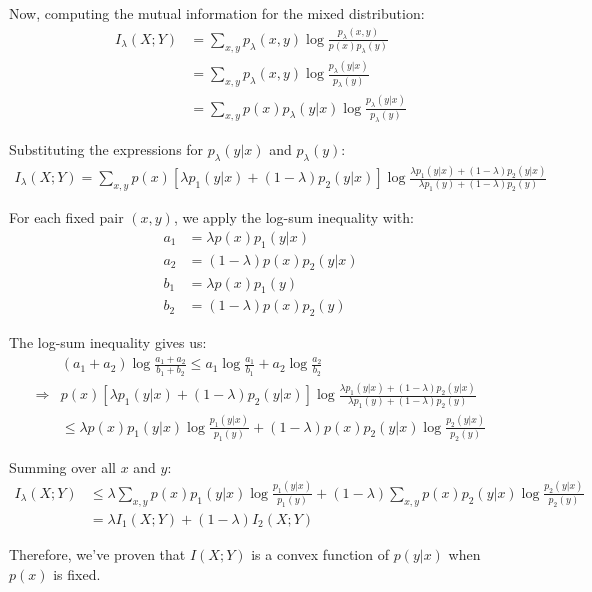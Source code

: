 Now, computing the mutual information for the mixed distribution:
\begin{align*}
I_{\lambda}(X;Y) &= \sum_{x,y} p_{\lambda}(x,y) \log \frac{p_{\lambda}(x,y)}{p(x)p_{\lambda}(y)} \\
&= \sum_{x,y} p_{\lambda}(x,y) \log \frac{p_{\lambda}(y|x)}{p_{\lambda}(y)} \\
&= \sum_{x,y} p(x)p_{\lambda}(y|x) \log \frac{p_{\lambda}(y|x)}{p_{\lambda}(y)}
\end{align*}

Substituting the expressions for $p_{\lambda}(y|x)$ and $p_{\lambda}(y)$:
\begin{align*}
I_{\lambda}(X;Y) = \sum_{x,y} p(x)[\lambda p_1(y|x) + (1-\lambda)p_2(y|x)] \log \frac{\lambda p_1(y|x) + (1-\lambda)p_2(y|x)}{\lambda p_1(y) + (1-\lambda)p_2(y)}
\end{align*}

For each fixed pair $(x,y)$, we apply the log-sum inequality with:
\begin{align*}
a_1 &= \lambda p(x)p_1(y|x) \\
a_2 &= (1-\lambda)p(x)p_2(y|x) \\
b_1 &= \lambda p(x)p_1(y) \\
b_2 &= (1-\lambda)p(x)p_2(y)
\end{align*}

The log-sum inequality gives us:
\begin{align*}
&(a_1 + a_2)\log\frac{a_1 + a_2}{b_1 + b_2} \leq a_1\log\frac{a_1}{b_1} + a_2\log\frac{a_2}{b_2} \\
\Rightarrow &p(x)[\lambda p_1(y|x) + (1-\lambda)p_2(y|x)] \log \frac{\lambda p_1(y|x) + (1-\lambda)p_2(y|x)}{\lambda p_1(y) + (1-\lambda)p_2(y)} \\ 
&\leq \lambda p(x)p_1(y|x)\log\frac{p_1(y|x)}{p_1(y)} + (1-\lambda)p(x)p_2(y|x)\log\frac{p_2(y|x)}{p_2(y)}
\end{align*}

Summing over all $x$ and $y$:
\begin{align*}
I_{\lambda}(X;Y) &\leq \lambda \sum_{x,y} p(x)p_1(y|x)\log\frac{p_1(y|x)}{p_1(y)} + (1-\lambda) \sum_{x,y} p(x)p_2(y|x)\log\frac{p_2(y|x)}{p_2(y)} \\
&= \lambda I_1(X;Y) + (1-\lambda) I_2(X;Y)
\end{align*}

Therefore, we've proven that $I(X;Y)$ is a convex function of $p(y|x)$ when $p(x)$ is fixed.




\newpage